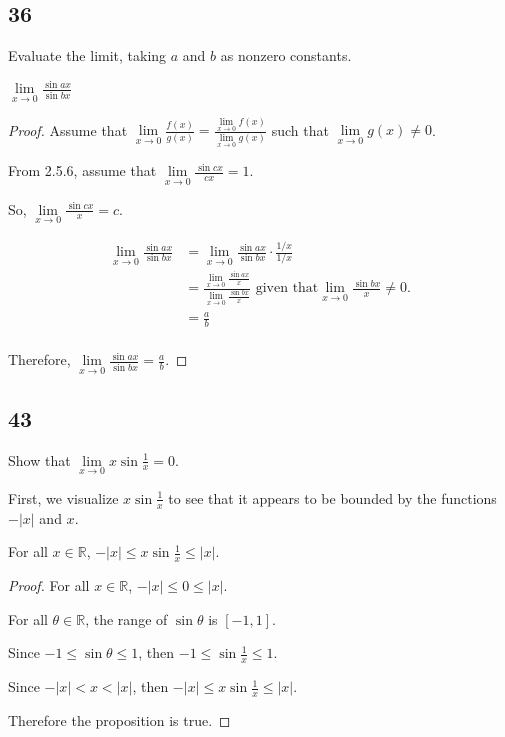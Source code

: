 \documentclass[../m134a-hw2.tex]{subfiles}
\begin{document}
\subsection*{36}
Evaluate the limit, taking $a$ and $b$ as nonzero constants.

$\lim\limits_{x \to 0} \frac{\sin{ax}}{\sin{bx}}$

\begin{proof}
    Assume that $\lim\limits_{x \to 0} \frac{f(x)}{g(x)} = \frac{\lim\limits_{x \to 0} f(x)}{\lim\limits_{x \to 0} g(x)}$ such that $\lim\limits_{x \to 0} g(x) \neq 0$.

    From 2.5.6, assume that $\lim\limits_{x \to 0} \frac{\sin{cx}}{cx} = 1$.

    So, $\lim\limits_{x \to 0} \frac{\sin{cx}}{x} = c$.

    \begin{align*}
        \lim\limits_{x \to 0} \frac{\sin{ax}}{\sin{bx}} &= \lim\limits_{x \to 0} \frac{\sin{ax}}{\sin{bx}} \cdot \frac{1/x}{1/x} \\
        &= \frac{\lim\limits_{x \to 0} \frac{\sin{ax}}{x}}{\lim\limits_{x \to 0} \frac{\sin{bx}}{x}} \text{ given that} \lim\limits_{x \to 0} \frac{\sin{bx}}{x} \neq 0. \\
        &= \frac{a}{b} \\
    \end{align*}

    Therefore, $\lim\limits_{x \to 0} \frac{\sin{ax}}{\sin{bx}} = \frac{a}{b}$.
\end{proof}

\subsection*{43}
Show that $\lim\limits_{x \to 0} x\sin{\frac{1}{x}} = 0$.

First, we visualize $x\sin{\frac{1}{x}}$ to see that it appears to be bounded by the functions $-|x|$ and $x$.

\begin{proposition}
    For all $x \in \mathbb{R}$, $-|x| \leq x\sin{\frac{1}{x}} \leq |x|$.
\end{proposition}

\begin{proof}
    For all $x \in \mathbb{R}$, $-|x| \leq 0 \leq |x|$.

    For all $\theta \in \mathbb{R}$, the range of $\sin{\theta}$ is $[-1,1]$.
    
    Since $-1 \leq \sin{\theta} \leq 1$, then $-1 \leq \sin{\frac{1}{x}} \leq 1$.

    Since $-|x|<x<|x|$, then $-|x| \leq x\sin{\frac{1}{x}} \leq |x|$. %

    Therefore the proposition is true.
\end{proof}
\end{document}
